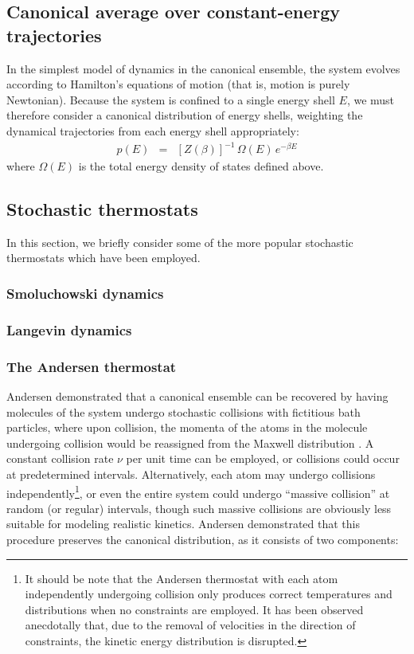 \subsection{Canonical average over constant-energy trajectories}

In the simplest model of dynamics in the canonical ensemble, the system evolves according to Hamilton's equations of motion (that is, motion is purely Newtonian).
Because the system is confined to a single energy shell $E$, we must therefore consider a canonical distribution of energy shells, weighting the dynamical trajectories from each energy shell appropriately:
\begin{eqnarray}
p(E) &=& [Z(\beta)]^{-1} \, \Omega(E) \, e^{-\beta E}
\end{eqnarray}
where $\Omega(E)$ is the total energy density of states defined above.

\subsection{Stochastic thermostats}

In this section, we briefly consider some of the more popular stochastic thermostats which have been employed.

\subsubsection{Smoluchowski dynamics}

\subsubsection{Langevin dynamics}

\subsubsection{The Andersen thermostat}

Andersen demonstrated that a canonical ensemble can be recovered by having molecules of the system undergo stochastic collisions with fictitious bath particles, where upon collision, the momenta of the atoms in the molecule undergoing collision would be reassigned from the Maxwell distribution \cite{andersen:1980a}.
A constant collision rate $\nu$ per unit time can be employed, or collisions could occur at predetermined intervals.  %
Alternatively, each atom may undergo collisions independently\footnote{It should be note that the Andersen thermostat with each atom independently undergoing collision only produces correct temperatures and distributions when no constraints are employed.  It has been observed anecdotally that, due to the removal of velocities in the direction of constraints, the kinetic energy distribution is disrupted.}, or even the entire system could undergo ``massive collision'' at random (or regular) intervals, though such massive collisions are obviously less suitable for modeling realistic kinetics.
Andersen demonstrated that this procedure preserves the canonical distribution, as it consists of two components:

